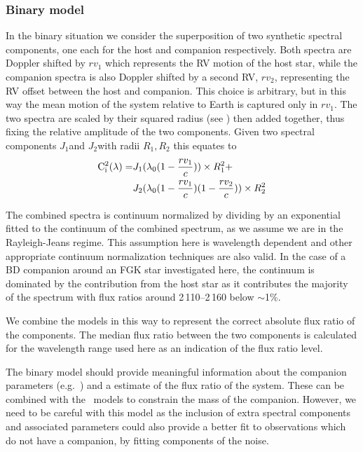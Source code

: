 \subsubsection{Binary model}
\label{subsubsec:binary-model}
In the binary situation we consider the superposition of two synthetic spectral components, one each for the host and companion respectively. Both spectra are Doppler shifted by \({rv}_1\) which represents the {RV} motion of the host star, while the companion spectra is also Doppler shifted by a second {RV}, \({rv}_2\), representing the {RV} offset between the host and companion. This choice is arbitrary, but in this way the mean motion of the system relative to Earth is captured only in \({rv}_1\). The two spectra are scaled by their squared radius (see ) then added together, thus fixing the relative amplitude of the two components.
Given two spectral components \(J_{1}\)and \(J_{2}\)with radii \(R_1, R_2\) this equates to
\begin{align}
\rm C^{2}_{i}(\lambda) = &  J_{1}(\lambda_{0}(1 - \frac{rv_{1}}{c}))\times R_{1}^2 +\nonumber \\
& J_{2}(\lambda_{0}(1-\frac{rv_{1}}{c})(1-\frac{rv_{2}}{c}))\times R_{2}^2
\end{align}


The combined spectra is continuum normalized by dividing by an exponential fitted to the continuum of the combined spectrum, as we assume we are in the Rayleigh-Jeans regime. This assumption here is wavelength dependent and other appropriate continuum normalization techniques are also valid. In the case of a BD companion around an FGK star investigated here, the continuum is dominated by the contribution from the host star as it contributes the majority of the spectrum with flux ratios around 2\,110--2\,160\nm{} below \(\sim\)1\%.

We combine the models in this way to represent the correct absolute flux ratio of the components. The median flux ratio between the two components is calculated for the wavelength range used here as an indication of the flux ratio level.

The binary model should provide meaningful information about the companion parameters (e.g.\ \teff{}) and a estimate of the flux ratio of the system. These can be combined with the~\citet{baraffe_evolutionary_2003} models to constrain the mass of the companion. However, we need to be careful with this model as the inclusion of extra spectral components and associated parameters could also provide a better fit to observations which do not have a companion, by fitting components of the noise.\\

